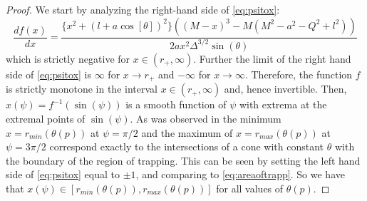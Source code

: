\documentclass[reqno]{amsart}
\numberwithin{equation}{section}
\theoremstyle{plain}
\theoremstyle{definition}
\begin{document}
\begin{proof}
 We start by analyzing the right-hand side of \eqref{eq:psitox}:
\begin{equation}
\frac{d f(x)}{d x}=\frac{\{x^2 + (l+a \cos [\theta])^2\}((M-x)^3-M(M^2-a^2-Q^2+l^2))}{2 a x^2 \Delta^{3/2}\sin(\theta)}
\end{equation} 
which is strictly negative for $x\in(r_+,\infty)$. Further the limit of the right hand side of \eqref{eq:psitox} is $\infty$ for $x\rightarrow r_+$ and $-\infty$ for $x\rightarrow\infty$. Therefore, the function $f$ is strictly monotone in the interval  $x\in(r_+,\infty)$ and, hence invertible. Then, $x(\psi)=f^{-1}(\sin(\psi))$ is a smooth function of $\psi$ with extrema at the extremal points of $\sin(\psi)$. As was observed in \cite{grenzebach_photon_2014} the minimum $x=r_{min}(\theta(p))$ at $\psi=\pi/2$ and the maximum of $x=r_{max}(\theta(p))$ at $\psi=3\pi/2$ correspond exactly to the intersections of a cone with constant $\theta$ with the boundary of the region of trapping. This can be seen by setting the left hand side of \eqref{eq:psitox} equal to $\pm1$, and comparing to \eqref{eq:areaoftrapp}. So we have that  $x(\psi)\in[r_{min}(\theta(p)),r_{max}(\theta(p))]$ for all values of $\theta(p)$.


\end{proof}
\end{document}
